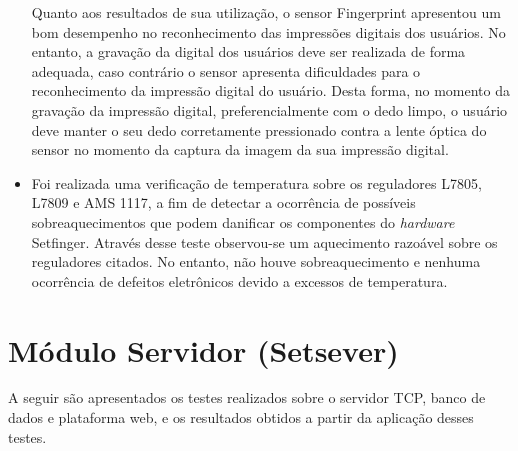 \begin{itemize}
    Quanto aos resultados de sua utilização, o sensor Fingerprint apresentou um bom desempenho no reconhecimento das impressões digitais dos usuários. No entanto, a gravação da digital dos usuários deve ser realizada de forma adequada, caso contrário o sensor apresenta dificuldades para o reconhecimento da impressão digital do usuário. Desta forma, no momento da gravação da impressão digital, preferencialmente com o dedo limpo, o usuário deve manter o seu dedo corretamente pressionado contra a lente óptica do sensor no momento da captura da imagem da sua impressão digital.
    
    \item Foi realizada uma verificação de temperatura sobre os reguladores L7805, L7809 e AMS 1117, a fim de detectar a ocorrência de possíveis sobreaquecimentos que podem danificar os componentes do \textit{hardware} Setfinger. Através desse teste observou-se um aquecimento razoável sobre os reguladores citados. No entanto, não houve sobreaquecimento e nenhuma ocorrência de defeitos eletrônicos devido a excessos de temperatura.
     
\end{itemize}



\section{Módulo Servidor (Setsever)\label{testes&resultados_servidor}}

A seguir são apresentados os testes realizados sobre o servidor TCP, banco de dados e plataforma web, e os resultados obtidos a partir da aplicação desses testes. 


